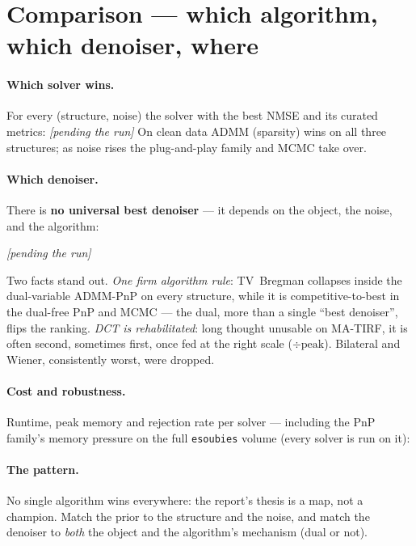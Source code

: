 \section{Comparison --- which algorithm, which denoiser, where}
\label{sec:comparison}

\paragraph{Which solver wins.}
For every (structure, noise) the solver with the best NMSE and its curated metrics:
%
  {\emph{[pending the run]}}
On clean data ADMM (sparsity) wins on all three structures; as noise rises the plug-and-play family
and MCMC take over.

\paragraph{Which denoiser.}
There is \textbf{no universal best denoiser} --- it depends on the object, the noise, and the
algorithm:
\begin{table}[H]\centering
\caption{Winning denoiser (best NMSE) per structure, noise, and plug-and-play algorithm.}
\label{tab:denoisers}
%
  {\emph{[pending the run]}}
\end{table}
Two facts stand out. \emph{One firm algorithm rule}: TV~Bregman collapses inside the dual-variable
ADMM-PnP on every structure, while it is competitive-to-best in the dual-free PnP and MCMC --- the
dual, more than a single ``best denoiser'', flips the ranking. \emph{DCT is rehabilitated}: long
thought unusable on MA-TIRF, it is often second, sometimes first, once fed at the right scale
($\div\text{peak}$). Bilateral and Wiener, consistently worst, were dropped.

\paragraph{Cost and robustness.}
Runtime, peak memory and rejection rate per solver --- including the PnP family's memory pressure on
the full \texttt{esoubies} volume (every solver is run on it):

\paragraph{The pattern.}
No single algorithm wins everywhere: the report's thesis is a map, not a champion. Match the prior
to the structure and the noise, and match the denoiser to \emph{both} the object and the
algorithm's mechanism (dual or not).
